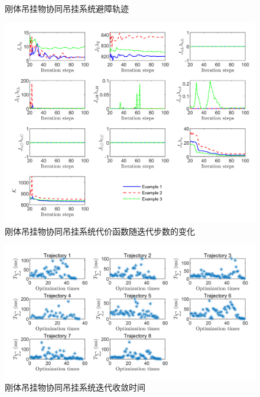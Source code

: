 \begin{figure}[htb!]
    \quad
    \\
    \caption{刚体吊挂物协同吊挂系统避障轨迹\label{rigid_trajectory}}
\end{figure}

\begin{figure}[htb!]
    \centering
    \includegraphics{fig/figure_chap6/cost_rigid.png}
    \caption{刚体吊挂物协同吊挂系统代价函数随迭代步数的变化\label{rigid_cost}}
\end{figure}

\begin{figure}[htb!]
    \centering
    \includegraphics[width = \textwidth]{fig/figure_chap6/time_rigid.png}
    \caption{刚体吊挂物协同吊挂系统迭代收敛时间\label{rigid_time}}
\end{figure}


